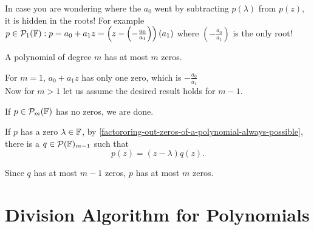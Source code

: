 In case you are wondering where the $a_0$ went by subtracting $p(\lambda)$ from $p(z)$, it is hidden in the roots! For example $p\in \mathcal{P}_1(\mathbb{F}): p=a_0+a_1z = \left(z- \left(-\frac{a_0}{a_1}\right)\right)(a_1)$ where $\left(-\frac{a_0}{a_1}\right)$ is the only root!

\setcounter{thm}{7}
\begin{thm}
  A polynomial of degree $m$ has at most $m$ zeros.
\end{thm}
\begin{prf}
  For $m=1$, $a_0+a_1z$ has only one zero, which is $-\frac{a_0}{a_1}$\\
  Now for $m>1$ let us assume the desired result holds for $m-1$.

  If $p\in \mathcal{P}_{m}(\mathbb{F})$ has no zeros, we are done.

  If $p$ has a zero $\lambda \in \mathbb{F}$, by \ref{factororing-out-zeros-of-a-polynomial-always-possible}, there is a $q \in \mathcal{P}(\mathbb{F})_{m-1}$ such that
  \begin{equation}
  	p(z)=(z-\lambda)q(z).
  \end{equation}

  Since $q$ has at most $m-1$ zeros, $p$ has at most $m$ zeros.
\end{prf}

\section{Division Algorithm for Polynomials}

